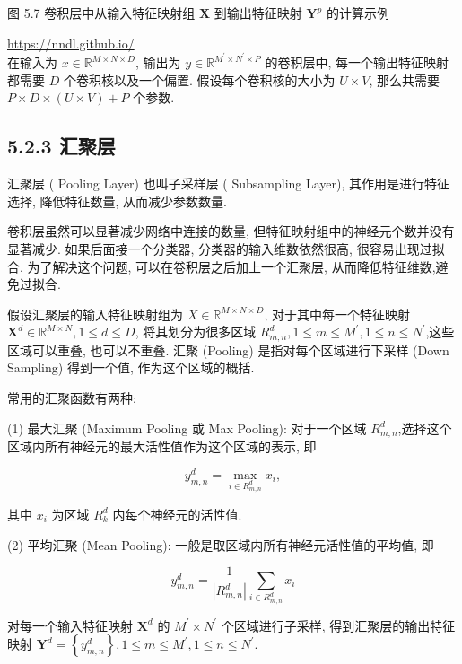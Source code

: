 \documentclass[10pt]{article}
\begin{document}
图 5.7 卷积层中从输入特征映射组 $\boldsymbol{X}$ 到输出特征映射 $\boldsymbol{Y}^{p}$ 的计算示例

\href{https://nndl.github.io/}{https://nndl.github.io/}\\
在输入为 $x \in \mathbb{R}^{M \times N \times D}$, 输出为 $y \in \mathbb{R}^{M^{\prime} \times N^{\prime} \times P}$ 的卷积层中, 每一个输出特征映射都需要 $D$ 个卷积核以及一个偏置. 假设每个卷积核的大小为 $U \times V$, 那么共需要 $P \times D \times(U \times V)+P$ 个参数.

\subsection*{5.2.3 汇聚层}
汇聚层 ( Pooling Layer) 也叫子采样层 ( Subsampling Layer), 其作用是进行特征选择, 降低特征数量, 从而减少参数数量.

卷积层虽然可以显著减少网络中连接的数量, 但特征映射组中的神经元个数并没有显著减少. 如果后面接一个分类器, 分类器的输入维数依然很高, 很容易出现过拟合. 为了解决这个问题, 可以在卷积层之后加上一个汇聚层, 从而降低特征维数,避免过拟合.

假设汇聚层的输入特征映射组为 $X \in \mathbb{R}^{M \times N \times D}$, 对于其中每一个特征映射 $\boldsymbol{X}^{d} \in \mathbb{R}^{M \times N}, 1 \leq d \leq D$, 将其划分为很多区域 $R_{m, n}^{d}, 1 \leq m \leq M^{\prime}, 1 \leq n \leq N^{\prime}$,这些区域可以重叠, 也可以不重叠. 汇聚 (Pooling) 是指对每个区域进行下采样 (Down Sampling) 得到一个值, 作为这个区域的概括.

常用的汇聚函数有两种:

(1) 最大汇聚 (Maximum Pooling 或 Max Pooling): 对于一个区域 $R_{m, n}^{d}$,选择这个区域内所有神经元的最大活性值作为这个区域的表示, 即


\begin{equation*}
y_{m, n}^{d}=\max _{i \in R_{m, n}^{d}} x_{i}, \tag{5.25}
\end{equation*}


其中 $x_{i}$ 为区域 $R_{k}^{d}$ 内每个神经元的活性值.

(2) 平均汇聚 (Mean Pooling): 一般是取区域内所有神经元活性值的平均值, 即


\begin{equation*}
y_{m, n}^{d}=\frac{1}{\left|R_{m, n}^{d}\right|} \sum_{i \in R_{m, n}^{d}} x_{i} \tag{5.26}
\end{equation*}


对每一个输入特征映射 $\boldsymbol{X}^{d}$ 的 $M^{\prime} \times N^{\prime}$ 个区域进行子采样, 得到汇聚层的输出特征映射 $\boldsymbol{Y}^{d}=\left\{y_{m, n}^{d}\right\}, 1 \leq m \leq M^{\prime}, 1 \leq n \leq N^{\prime}$.
\end{document}

